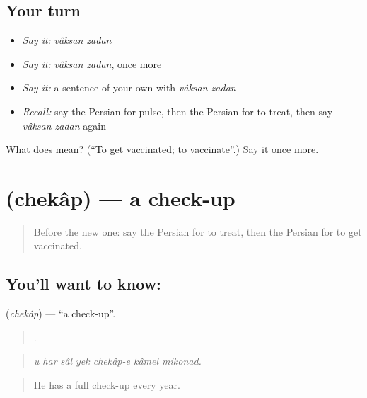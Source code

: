 \subsection*{Your turn}
\begin{itemize}
\raggedright
  \item \emph{Say it:} \emph{vâksan zadan}
  \item \emph{Say it:} \emph{vâksan zadan}, once more
  \item \emph{Say it:} a sentence of your own with \emph{vâksan zadan}
  \item \emph{Recall:} say the Persian for pulse, then the Persian for to treat, then say \emph{vâksan zadan} again
\end{itemize}

\begin{tcolorbox}[breakable,colback=teal!4,colframe=teal!35!black,title={Before you move on}]
What does   mean? (\textquotedblleft{}To get vaccinated; to vaccinate\textquotedblright{}.) Say it once more.
\end{tcolorbox}
\section[\texorpdfstring{\fa{چکاپ} (chekâp)}{چکاپ (chekâp)}]{ (chekâp) — a check-up}

\label{lesson:FA-C493-chekap}



\begin{quote}
Before the new one: say the Persian for to treat, then the Persian for to get vaccinated.
\end{quote}

\subsection*{You'll want to know: }
\textbf{} (\emph{chekâp}) — \textquotedblleft{}a check-up\textquotedblright{}.

\begin{quote}
      .
\end{quote}

\begin{quote}
\emph{u har sâl yek chekâp-e kâmel mikonad.}
\end{quote}

\begin{quote}
He has a full check-up every year.
\end{quote}

